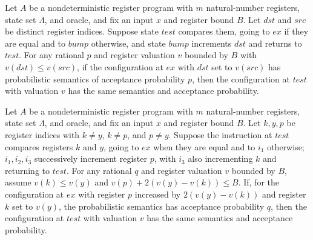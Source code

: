 \begin{theorem}
\label{Complexity.LogProg.psem_copy}
\leanok
{}
Let $A$ be a nondeterministic register program with $m$ natural-number registers, state
set $\Lambda$, and oracle, and fix an input $x$ and register bound $B$. Let $dst$ and
$src$ be distinct register indices. Suppose state $test$ compares them, going to $ex$ if
they are equal and to $bump$ otherwise, and state $bump$ increments $dst$ and returns to
$test$. For any rational $p$ and register valuation $v$ bounded by $B$ with $v(dst)\le
v(src)$, if the configuration at $ex$ with $dst$ set to $v(src)$ has probabilistic
semantics of acceptance probability $p$, then the configuration at $test$ with valuation
$v$ has the same semantics and acceptance probability.
\end{theorem}

\begin{theorem}
\label{Complexity.LogProg.psem_addTwice}
\leanok
{}
Let $A$ be a nondeterministic register program with $m$ natural-number registers, state
set $\Lambda$, and oracle, and fix an input $x$ and register bound $B$. Let $k,y,p$ be
register indices with $k\ne y$, $k\ne p$, and $p\ne y$. Suppose the instruction at
$test$ compares registers $k$ and $y$, going to $ex$ when they are equal and to $i_1$
otherwise; $i_1,i_2,i_3$ successively increment register $p$, with $i_3$ also
incrementing $k$ and returning to $test$. For any rational $q$ and register valuation
$v$ bounded by $B$, assume $v(k)\le v(y)$ and $v(p)+2(v(y)-v(k))\le B$. If, for the
configuration at $ex$ with register $p$ increased by $2(v(y)-v(k))$ and register $k$ set
to $v(y)$, the probabilistic semantics has acceptance probability $q$, then the
configuration at $test$ with valuation $v$ has the same semantics and acceptance
probability.
\end{theorem}

